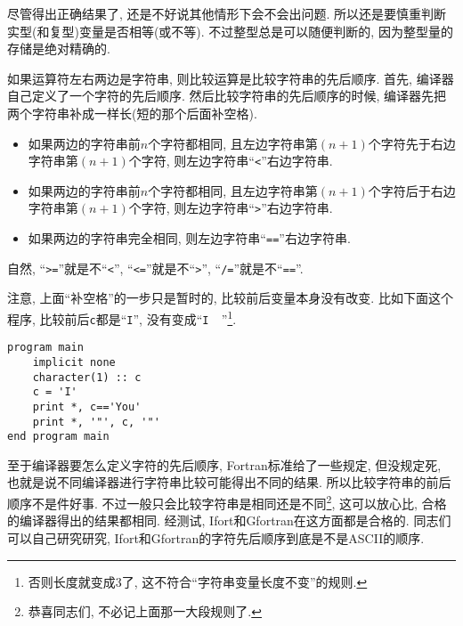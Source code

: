 尽管得出正确结果了, 还是不好说其他情形下会不会出问题. 所以还是要慎重判断实型(和复型)变量是否相等(或不等). 不过整型总是可以随便判断的, 因为整型量的存储是绝对精确的.

如果运算符左右两边是字符串, 则比较运算是比较字符串的先后顺序. 首先, 编译器自己定义了一个字符的先后顺序. 然后比较字符串的先后顺序的时候, 编译器先把两个字符串补成一样长(短的那个后面补空格).
\begin{itemize}
    \item 如果两边的字符串前$n$个字符都相同, 且左边字符串第$(n+1)$个字符先于右边字符串第$(n+1)$个字符, 则左边字符串``\verb|<|''右边字符串.
    \item 如果两边的字符串前$n$个字符都相同, 且左边字符串第$(n+1)$个字符后于右边字符串第$(n+1)$个字符, 则左边字符串``\verb|>|''右边字符串.
    \item 如果两边的字符串完全相同, 则左边字符串``\verb|==|''右边字符串.
\end{itemize}
自然, ``\verb|>=|''就是不``\verb|<|'', ``\verb|<=|''就是不``\verb|>|'', ``\verb|/=|''就是不``\verb|==|''.

注意, 上面``补空格''的一步只是暂时的, 比较前后变量本身没有改变. 比如下面这个程序, 比较前后\verb|c|都是``\verb|I|'', 没有变成``\verb|I  |''\footnote{
否则长度就变成3了, 这不符合``字符串变量长度不变''的规则.
}.
\begin{lstlisting}
program main
    implicit none
    character(1) :: c
    c = 'I'
    print *, c=='You'
    print *, '"', c, '"'
end program main
\end{lstlisting}

至于编译器要怎么定义字符的先后顺序, Fortran标准给了一些规定, 但没规定死, 也就是说不同编译器进行字符串比较可能得出不同的结果. 所以比较字符串的前后顺序不是件好事. 不过一般只会比较字符串是相同还是不同\footnote{
    恭喜同志们, 不必记上面那一大段规则了.
}, 这可以放心比, 合格的编译器得出的结果都相同. 经测试, Ifort和Gfortran在这方面都是合格的. 同志们可以自己研究研究, Ifort和Gfortran的字符先后顺序到底是不是ASCII的顺序.
